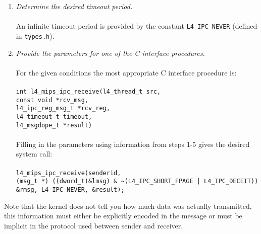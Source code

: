 \begin{enumerate}
\item \emph{Determine the desired timeout period.} \\ \\ \hspace*{10pt}
  An infinite timeout period is provided by the constant 
  {\footnotesize\verb+L4_IPC_NEVER+} (defined in {\footnotesize\verb+types.h+}). 
  
\item \emph{Provide the parameters for one of the C interface 
    procedures.} \\ \\ \hspace*{10pt}
  For the given conditions the most appropriate C interface procedure 
  is:\\ \\
  \hspace*{20pt} {\footnotesize\verb+int l4_mips_ipc_receive(l4_thread_t src,+} \\ 
  \hspace*{130pt} {\footnotesize\verb+const void *rcv_msg,+} \\
  \hspace*{130pt} {\footnotesize\verb+l4_ipc_reg_msg_t *rcv_reg,+}\\ 
  \hspace*{130pt} {\footnotesize\verb+l4_timeout_t timeout,+}\\ 
  \hspace*{130pt} {\footnotesize\verb+l4_msgdope_t *result)+}\\ \\
  \hspace*{10pt} Filling in the parameters using information from steps
  1-5 gives the desired system call: \\ \\
  \hspace*{20pt} {\footnotesize\verb+l4_mips_ipc_receive(senderid,+}\\
  \hspace*{80pt} {\footnotesize\verb+(msg_t *) ((dword_t)&lmsg) & ~(L4_IPC_SHORT_FPAGE | L4_IPC_DECEIT))+}\\
  \hspace*{80pt} {\footnotesize\verb+&rmsg, L4_IPC_NEVER, &result);+}
  
\end{enumerate}

Note that the kernel does not tell you how much data was actually
transmitted, this information must either be explicitly encoded in the
message or must be implicit in the protocol used between sender and
receiver.


